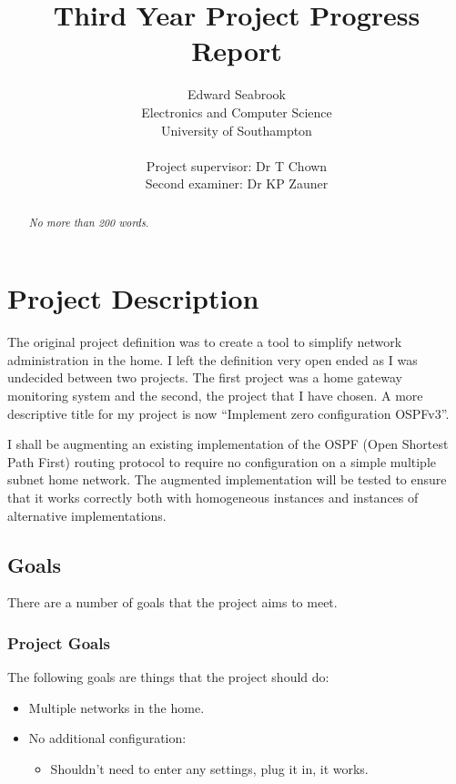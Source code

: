 \documentclass[12pt]{report}
\author{Edward Seabrook \\ 
Electronics and Computer Science \\ 
University of Southampton \\ \\
Project supervisor: Dr T Chown \\
Second examiner: Dr KP Zauner}
\title{Third Year Project Progress Report}
\begin{document}



\begin{abstract}
\em No more than 200 words. \em


\end{abstract}

\tableofcontents

\chapter{Project Description}

The original project definition was to create a tool to simplify network
administration in the home.  I left the definition very open ended as I was
undecided between two projects. The first project was a home gateway monitoring
system and the second, the project that I have chosen. A more descriptive title
for my project is now ``Implement zero configuration OSPFv3''.

I shall be augmenting an existing implementation of the OSPF (Open Shortest Path
First) routing protocol to require no configuration on a simple multiple subnet
home network. The augmented implementation will be tested to ensure that it
works correctly both with homogeneous instances and instances of alternative
implementations. 

\section{Goals}

There are a number of goals that the project aims to meet.

\subsection{Project Goals }
The following goals are things that the project should do:

\begin{itemize}

	\item Multiple networks in the home. 

	\item No additional configuration:

		\begin{itemize}	
  		\item Shouldn't need to enter any settings, plug it in, it works. 
		\end{itemize}
\end{itemize}
\end{document}
